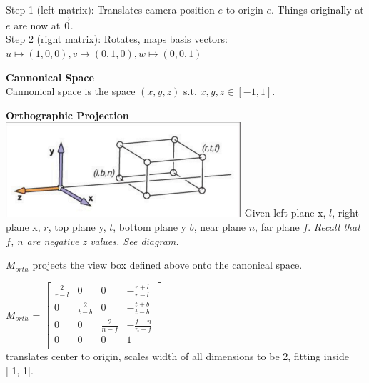 \documentclass[letterpaper, 8pt]{extarticle}
\begin{document}
\begin{multicols*}{4}
Step 1 (left matrix): Translates camera position $e$ to origin $e$. Things originally at $e$ are now at $\vec{0}$.\\
Step 2 (right matrix): Rotates, maps basis vectors: $u \mapsto (1,0,0), v \mapsto (0,1,0), w \mapsto (0,0,1)$

\textbf{Cannonical Space}\\
Cannonical space is the space $(x, y, z)$ s.t. $x,y,z \in [-1, 1]$.

\textbf{Orthographic Projection}\\

\includegraphics[width=.5\linewidth]{cam-ortho.png}
Given left plane x, $l$, right plane x, $r$, top plane y, $t$, bottom plane y $b$, near plane $n$, far plane $f$.
\textit{Recall that $f$, $n$ are negative z values. See diagram.}

$M_{orth}$ projects the view box defined above onto the canonical space.


$M_{orth}$ = 
\(
\begin{bmatrix}
    \frac{2}{r-l} & 0             & 0             & -\frac{r+l}{r-l} \\
    0             & \frac{2}{t-b} & 0             & -\frac{t+b}{t-b} \\
    0             & 0             & \frac{2}{n-f} & -\frac{f+n}{n-f} \\
    0             & 0             & 0             & 1                \\
\end{bmatrix}
\)\\
translates center to origin, scales width of all dimensions to be 2, fitting inside [-1, 1].


\end{multicols*}
\end{document}
